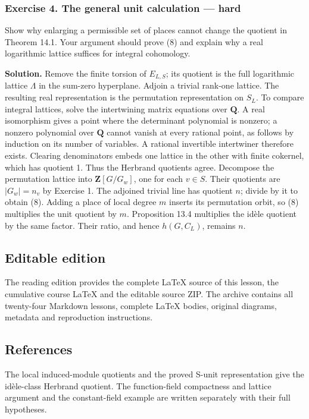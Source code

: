 \documentclass[11pt,a4paper]{article}
\begin{document}
\subsubsection{Exercise 4. The general unit calculation ---
hard}\label{exercise-4.-the-general-unit-calculation-hard}

Show why enlarging a permissible set of places cannot change the
quotient in Theorem 14.1. Your argument should prove (8) and explain why
a real logarithmic lattice suffices for integral cohomology.

\textbf{Solution.} Remove the finite torsion of \(E_{L,S}\); its
quotient is the full logarithmic lattice \(\Lambda\) in the sum-zero
hyperplane. Adjoin a trivial rank-one lattice. The resulting real
representation is the permutation representation on \(S_L\). To compare
integral lattices, solve the intertwining matrix equations over
\(\mathbf Q\). A real isomorphism gives a point where the determinant
polynomial is nonzero; a nonzero polynomial over \(\mathbf Q\) cannot
vanish at every rational point, as follows by induction on its number of
variables. A rational invertible intertwiner therefore exists. Clearing
denominators embeds one lattice in the other with finite cokernel, which
has quotient 1. Thus the Herbrand quotients agree. Decompose the
permutation lattice into \(\mathbf Z[G/G_w]\), one for each \(v\in S\).
Their quotients are \(|G_w|=n_v\) by Exercise 1. The adjoined trivial
line has quotient \(n\); divide by it to obtain (8). Adding a place of
local degree \(m\) inserts its permutation orbit, so (8) multiplies the
unit quotient by \(m\). Proposition 13.4 multiplies the idèle quotient
by the same factor. Their ratio, and hence \(h(G,C_L)\), remains \(n\).

\subsection{Editable edition}\label{editable-edition}

The reading edition provides the complete LaTeX source of this lesson,
the cumulative course LaTeX and the editable source ZIP. The archive
contains all twenty-four Markdown lessons, complete LaTeX bodies,
original diagrams, metadata and reproduction instructions.

\subsection{References}\label{references}

The local induced-module quotients and the proved S-unit representation
give the idèle-class Herbrand quotient. The function-field compactness
and lattice argument and the constant-field example are written
separately with their full hypotheses.
\end{document}
